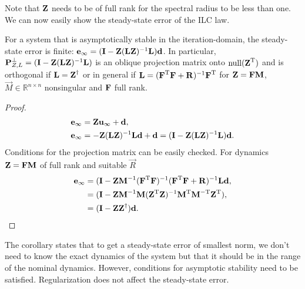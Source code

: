 %
Note that $\latentMat$ needs to be of full rank for the spectral radius to be less than one. We can now easily show the steady-state error of the ILC law.
%
\begin{cor}
For a system that is asymptotically stable in the iteration-domain, the steady-state error is finite: $\error_{\infty} = (\vec{I} - \latentMat(\lmatrix\latentMat)^{-1}\lmatrix)\linDist$. In particular, $\projOblique = (\vec{I} - \latentMat(\lmatrix\latentMat)^{-1}\lmatrix)$ is an oblique projection matrix onto $\mathrm{null}(\latentMat^{\mathrm{T}})$ and is orthogonal if $\lmatrix = \latentMat^{\dagger}$ or in general if $\lmatrix = (\systemMat^{\mathrm{T}}\systemMat + \vec{R})^{-1}\systemMat^{\mathrm{T}}$ for $\latentMat = \systemMat\vec{M}$, $\vec{M} \in \mathbb{R}^{n \times n}$ nonsingular and $\systemMat$ full rank.
\end{cor}
%
\begin{proof}
%
\begin{align}
\error_{\infty} &= \latentMat\sysInput_{\infty} + \linDist, \\
\error_{\infty} &= -\latentMat(\lmatrix\latentMat)^{-1}\lmatrix\linDist + \linDist = (\vec{I} - \latentMat(\lmatrix\latentMat)^{-1}\lmatrix)\linDist.
\end{align}
%
Conditions for the projection matrix can be easily checked. For dynamics $\latentMat = \systemMat\vec{M}$ of full rank and suitable $\vec{R}$
%
\begin{align}
\error_{\infty} &= (\vec{I} - \latentMat\vec{M}^{-1}(\systemMat^{\mathrm{T}}\systemMat)^{-1}(\systemMat^{\mathrm{T}}\systemMat + \vec{R})^{-1}\lmatrix\linDist, \\
&= (\vec{I} - \latentMat\vec{M}^{-1}\vec{M}(\latentMat^{\mathrm{T}}\latentMat)^{-1}\vec{M}^{\mathrm{T}}\vec{M}^{-\mathrm{T}}\latentMat^{\mathrm{T}}), \\
&= (\vec{I} - \latentMat\latentMat^{\dagger})\linDist.
\end{align}
%
\end{proof}
%
The corollary states that to get a steady-state error of smallest norm, we don't need to know the exact dynamics of the system but that it should be in the range of the nominal dynamics. However, conditions for asymptotic stability need to be satisfied. Regularization does not affect the steady-state error.

